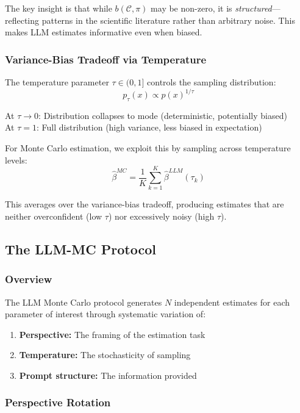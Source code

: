 The key insight is that while $b(\mathcal{C}, \pi)$ may be non-zero, it is \textit{structured}---reflecting patterns in the scientific literature rather than arbitrary noise. This makes LLM estimates informative even when biased.

\subsubsection{Variance-Bias Tradeoff via Temperature}

The temperature parameter $\tau \in (0, 1]$ controls the sampling distribution:
\begin{equation}
p_\tau(x) \propto p(x)^{1/\tau}
\end{equation}

At $\tau \to 0$: Distribution collapses to mode (deterministic, potentially biased)\\
At $\tau = 1$: Full distribution (high variance, less biased in expectation)

For Monte Carlo estimation, we exploit this by sampling across temperature levels:
\begin{equation}
\hat{\beta}^{MC} = \frac{1}{K} \sum_{k=1}^{K} \hat{\beta}^{LLM}(\tau_k)
\end{equation}

This averages over the variance-bias tradeoff, producing estimates that are neither overconfident (low $\tau$) nor excessively noisy (high $\tau$).

\subsection{The LLM-MC Protocol}

\subsubsection{Overview}

The LLM Monte Carlo protocol generates $N$ independent estimates for each parameter of interest through systematic variation of:
\begin{enumerate}
    \item \textbf{Perspective:} The framing of the estimation task
    \item \textbf{Temperature:} The stochasticity of sampling
    \item \textbf{Prompt structure:} The information provided
\end{enumerate}

\subsubsection{Perspective Rotation}

